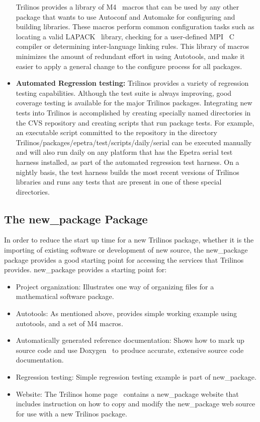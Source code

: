 \documentclass[acmtoms,acmnow]{acmtrans2m}
\begin{document}
\begin{itemize}
Trilinos provides a library of M4~\cite{M4} macros that can be used by any other
package that wants to use Autoconf and Automake for configuring and
building libraries.  These macros perform common configuration tasks such as
locating a valid LAPACK~\cite{lapack} library, checking for a
user-defined MPI~\cite{MPI} C compiler or determining inter-language linking
rules.  This library of macros minimizes the amount of redundant
 effort in using Autotools, and make it easier to apply a general change to
the configure process for all packages.

\item {\bf Automated Regression testing:} Trilinos provides a variety of regression
testing capabilities.  Although the test suite is always improving,
good coverage testing is available for the major Trilinos packages.
Integrating new tests into Trilinos is accomplished by creating
specially named directories in the CVS repository and creating scripts
that run package tests.  For example, an executable script committed
to the repository in the directory 
Trilinos/packages/epetra/test/scripts/daily/serial can be executed manually and
will also run daily on any platform that has the Epetra serial test harness
installed, as part of the automated regression test harness.  On a nightly 
basis, the test harness builds the most recent versions of Trilinos libraries 
and runs any tests that are present in one of these special directories.  
\end{itemize}

\subsection{The new\_package Package} 

In order to reduce the start up time for a new Trilinos package,
whether it is the importing of existing software or development of new
source, the new\_package package provides a good starting point for
accessing the services that Trilinos provides.
new\_package provides a
starting point for:
\begin{itemize}
\item Project organization:  Illustrates one way of
organizing files for a mathematical software package.
\item Autotools: As mentioned above, provides simple working example
using autotools, and a set of M4 macros.
\item Automatically generated reference documentation: Shows how
to mark up source code and use Doxygen~\cite{Doxygen} to produce
accurate, extensive source code documentation.
\item Regression testing: Simple regression testing example is part of
new\_package.
\item Website: The Trilinos home page~\cite{Trilinos-home-page}
contains a new\_package website that includes instruction on how to
copy and modify the new\_package web source for use with a new
Trilinos package.
\end{itemize}
\end{document}
